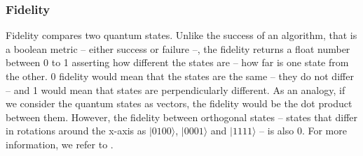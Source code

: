 \subsubsection{Fidelity}

Fidelity compares two quantum states.
Unlike the success of an algorithm, that is a boolean metric -- either success or failure --, the fidelity returns a float number between 0 to 1 asserting how different the states are -- how far is one state from the other.
0 fidelity  would mean that the states are the same -- they do not differ -- and 1 would mean that states are perpendicularly different.
As an analogy, if we consider the quantum states as vectors, the fidelity would be the dot product between them.
However, the fidelity between orthogonal states -- states that differ in rotations around the x-axis as \(| 0100 \rangle\), \(| 0001 \rangle\) and \(| 1111 \rangle\) -- is also 0.
For more information, we refer to \cite{Nielsen_2009}.





